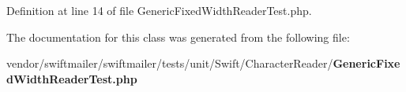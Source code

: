 Definition at line 14 of file Generic\+Fixed\+Width\+Reader\+Test.\+php.



The documentation for this class was generated from the following file\+:\begin{DoxyCompactItemize}
\item 
vendor/swiftmailer/swiftmailer/tests/unit/\+Swift/\+Character\+Reader/{\bf Generic\+Fixed\+Width\+Reader\+Test.\+php}\end{DoxyCompactItemize}
